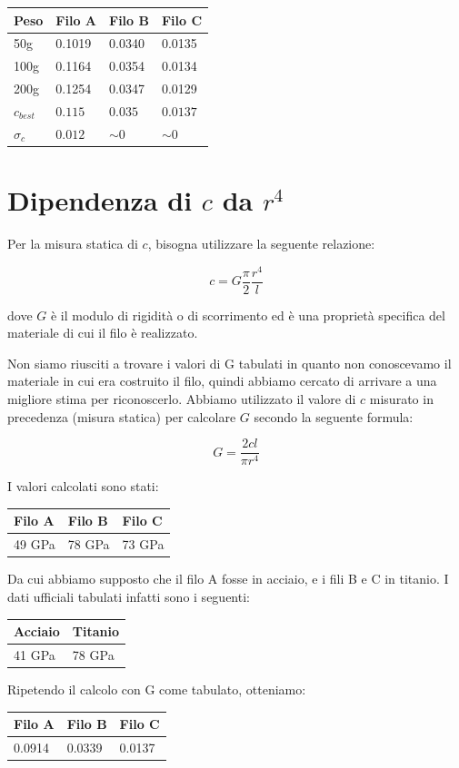 \begin{center}
\begin{tabular}{l|lll}
Peso & Filo A & Filo B & Filo C \\
\midrule
50g & 0.1019 & 0.0340 & 0.0135 \\
100g & 0.1164 & 0.0354 & 0.0134 \\
200g & 0.1254 & 0.0347 & 0.0129 \\
\midrule
$c_{best}$ & $0.115$ & $0.035$& $0.0137$ \\
$\sigma_{c}$ & $0.012$ & $\sim0$ & $\sim 0$ \\
\end{tabular}
\end{center}

\section{Dipendenza di $c$ da $r^4$}

Per la misura statica di $c$, bisogna utilizzare la seguente relazione:

$$ c = G \frac{\pi}{2}\frac{r^4}{l} $$

dove $G$ è il modulo di rigidità o di scorrimento ed è una proprietà specifica del materiale di cui il filo è realizzato.

Non siamo riusciti a trovare i valori di G tabulati in quanto non conoscevamo il materiale in cui era costruito il filo, quindi abbiamo cercato di arrivare a una migliore stima per riconoscerlo. Abbiamo utilizzato il valore di $c$ misurato in precedenza (misura statica) per calcolare $G$ secondo la seguente formula:

$$ G = \frac{2cl}{\pi r^4} $$

I valori calcolati sono stati:
\begin{center}
\begin{tabular}{lll}
Filo A & Filo B & Filo C \\
\midrule
49 GPa & 78 GPa & 73 GPa \\
\end{tabular}
\end{center}

Da cui abbiamo supposto che il filo A fosse in acciaio, e i fili B e C in titanio.
I dati ufficiali tabulati infatti sono i seguenti:
\begin{center}
\begin{tabular}{ll}
Acciaio & Titanio \\
\midrule
41 GPa & 78 GPa \\
\end{tabular}
\end{center}
Ripetendo il calcolo con G come tabulato, otteniamo:
\begin{center}
\begin{tabular}{lll}
Filo A & Filo B & Filo C \\
\midrule
0.0914 & 0.0339 & 0.0137 \\
\end{tabular}
\end{center}

